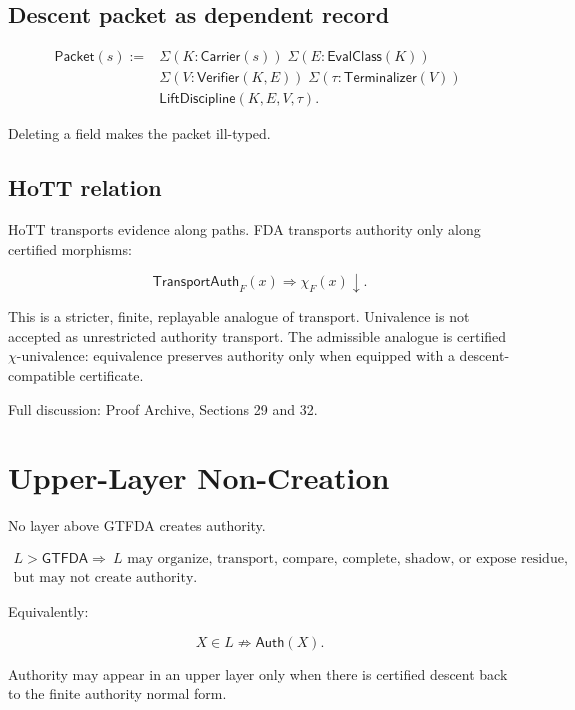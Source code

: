 \documentclass[11pt]{article}
\begin{document}
\subsection{Descent packet as dependent record}

\[
\boxed{
\begin{aligned}
\mathsf{Packet}(s) := {}&
\Sigma(K:\mathsf{Carrier}(s))\;
\Sigma(E:\mathsf{EvalClass}(K))\;\\
&\Sigma(V:\mathsf{Verifier}(K,E))\;
\Sigma(\tau:\mathsf{Terminalizer}(V))\;\\
&\mathsf{LiftDiscipline}(K,E,V,\tau).
\end{aligned}
}
\]

Deleting a field makes the packet ill-typed.

\subsection{HoTT relation}

HoTT transports evidence along paths. FDA transports authority only along certified morphisms:

\[
\boxed{
\mathsf{TransportAuth}_F(x)\Rightarrow\chi_F(x)\downarrow.
}
\]

This is a stricter, finite, replayable analogue of transport. Univalence is not accepted as unrestricted authority transport. The admissible analogue is certified \(\chi\)-univalence: equivalence preserves authority only when equipped with a descent-compatible certificate.

Full discussion: Proof Archive, Sections 29 and 32.

\section{Upper-Layer Non-Creation}

No layer above GTFDA creates authority.

\[
\boxed{
\begin{gathered}
L>\mathsf{GTFDA} \Rightarrow\
L\text{ may organize, transport, compare, complete, shadow, or expose residue,}\\
\text{but may not create authority.}
\end{gathered}
}
\]

Equivalently:

\[
\boxed{
X\in L\not\Rightarrow\mathsf{Auth}(X).
}
\]

Authority may appear in an upper layer only when there is certified descent back to the finite authority normal form.
\end{document}
